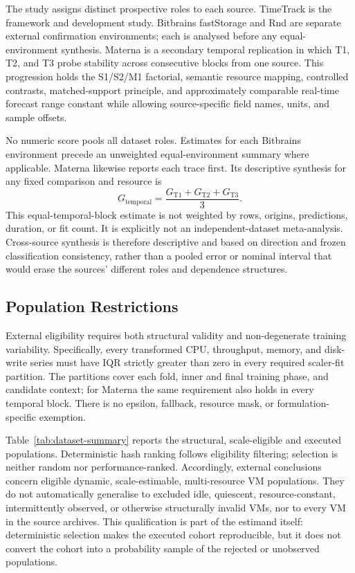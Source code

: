 \documentclass[a4paper,fleqn]{cas-dc}
\begin{document}
The study assigns distinct prospective roles to each source.  TimeTrack is the
framework and development study.  Bitbrains fastStorage and Rnd are separate
external confirmation environments; each is analysed before any
equal-environment synthesis.  Materna is a secondary temporal replication in
which T1, T2, and T3 probe stability across consecutive blocks from one source.
This progression holds the S1/S2/M1 factorial, semantic resource mapping,
controlled contrasts, matched-support principle, and approximately comparable
real-time forecast range constant while allowing source-specific field names,
units, and sample offsets.

No numeric score pools all dataset roles.  Estimates for each Bitbrains
environment precede an unweighted equal-environment summary where applicable.
Materna likewise reports each trace first.  Its descriptive synthesis for any
fixed comparison and resource is
\begin{equation}
  G_{\mathrm{temporal}}
  = \frac{G_{\mathrm{T1}}+G_{\mathrm{T2}}+G_{\mathrm{T3}}}{3}.
  \label{eq:temporal-synthesis}
\end{equation}
This equal-temporal-block estimate is not weighted by rows, origins,
predictions, duration, or fit count.  It is explicitly not an
independent-dataset meta-analysis.  Cross-source synthesis is therefore
descriptive and based on direction and frozen classification consistency,
rather than a pooled error or nominal interval that would erase the sources'
different roles and dependence structures.

\subsection{Population Restrictions}
\label{sec:population-restrictions}

External eligibility requires both structural validity and non-degenerate
training variability.  Specifically, every transformed CPU, throughput,
memory, and disk-write series must have IQR strictly greater than zero in every
required scaler-fit partition.  The partitions cover each fold, inner and final
training phase, and candidate context; for Materna the same requirement also
holds in every temporal block.  There is no epsilon, fallback, resource mask,
or formulation-specific exemption.

Table~\ref{tab:dataset-summary} reports the structural, scale-eligible and
executed populations. Deterministic hash ranking follows eligibility
filtering; selection is neither random nor performance-ranked. Accordingly, external
conclusions concern eligible dynamic, scale-estimable, multi-resource VM
populations.  They do not automatically generalise to excluded idle,
quiescent, resource-constant, intermittently observed, or otherwise
structurally invalid VMs, nor to every VM in the source archives.  This
qualification is part of the estimand itself: deterministic selection makes the
executed cohort reproducible, but it does not convert the cohort into a
probability sample of the rejected or unobserved populations.
\end{document}

